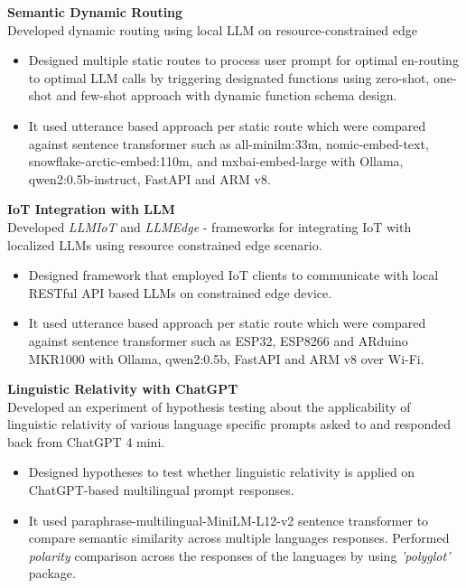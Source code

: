 \documentclass[10pt,a4paper]{article}
\begin{document}
	
	\textbf{Semantic Dynamic Routing} \hfill \textit{}\\
	Developed dynamic routing using local LLM on resource-constrained edge
	\begin{itemize}[leftmargin=0.2in]
		\item Designed multiple static routes to process user prompt for optimal en-routing to optimal LLM calls by triggering designated functions using zero-shot, one-shot and few-shot approach with dynamic function schema design.
		\item It used utterance based approach per static route which were compared against sentence transformer such as all-minilm:33m, nomic-embed-text, snowflake-arctic-embed:110m, and mxbai-embed-large
		with Ollama, qwen2:0.5b-instruct, FastAPI and ARM v8. 
		
	\end{itemize}
	
	\textbf{IoT Integration with LLM} \hfill \textit{}\\
	Developed \textit{LLMIoT} and \textit{LLMEdge} - frameworks for integrating IoT with localized LLMs using resource constrained edge scenario.
	\begin{itemize}[leftmargin=0.2in]
		\item Designed framework that employed IoT clients to communicate with local RESTful API based LLMs on constrained edge device.
		\item It used utterance based approach per static route which were compared against sentence transformer such as ESP32, ESP8266 and ARduino MKR1000 with Ollama, qwen2:0.5b, FastAPI and ARM v8 over Wi-Fi. 
		
	\end{itemize}
	
	\textbf{Linguistic Relativity with ChatGPT} \hfill \textit{}\\
	Developed an experiment of hypothesis testing about the applicability of linguistic relativity of various language specific prompts asked to and responded back from ChatGPT 4 mini.
	\begin{itemize}[leftmargin=0.2in]
		\item Designed hypotheses to test whether linguistic relativity is applied on ChatGPT-based multilingual prompt responses.
		\item It used paraphrase-multilingual-MiniLM-L12-v2 sentence transformer to compare semantic similarity across multiple languages responses. Performed \textit{polarity} comparison across the responses of the languages by using \textit{'polyglot'} package. 
		
	\end{itemize}
	
\end{document}
